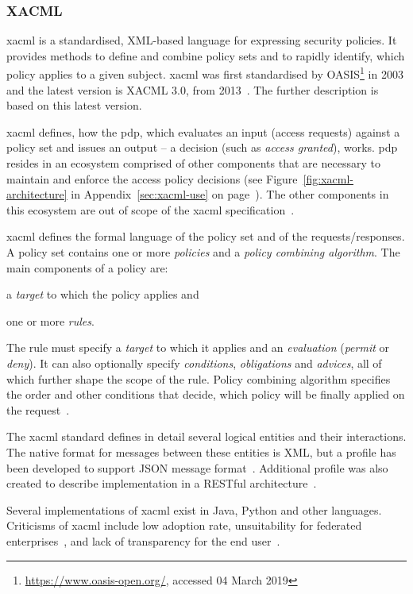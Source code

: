 \subsubsection{XACML}\label{sec:xacml}

 \acrfull{xacml} is a standardised, XML-based language for expressing security policies. It provides methods to define and combine policy sets and to rapidly identify, which policy applies to a given subject. \acrshort{xacml} was first standardised by OASIS\footnote{\url{https://www.oasis-open.org/}, accessed 04 March 2019} in 2003 and the latest version is XACML 3.0, from 2013~\cite{OASISStandard2013EXtensible3.0}. The further description is based on this latest version.
 
\acrshort{xacml} defines, how the \acrfull{pdp}, which evaluates an input (access requests) against a policy set and issues an output -- a decision (such as \textit{access granted}), works. \acrshort{pdp} resides in an ecosystem comprised of other components that are necessary to maintain and enforce the access policy decisions (see Figure~\ref{fig:xacml-architecture} in Appendix~\ref{sec:xacml-use} on page~\pageref{fig:xacml-architecture}). The other components in this ecosystem are out of scope of the \acrshort{xacml} specification~\cite{OASISStandard2013EXtensible3.0}.

\acrshort{xacml} defines the formal language of the policy set and of the requests/responses. A policy set contains one or more \textit{policies} and a \textit{policy combining algorithm}. The main components of a policy are:
% 
\begin{enumerate*}[label=(\roman*)]
    \item a \textit{target} to which the policy applies and
    \item one or more \textit{rules}.
\end{enumerate*} 
% 
The rule must specify a \textit{target} to which it applies and an \textit{evaluation} (\textit{permit} or \textit{deny}). It can also optionally specify \textit{conditions}, \textit{obligations} and \textit{advices}, all of which further shape the scope of the rule. Policy combining algorithm specifies the order and other conditions that decide, which policy will be finally applied on the request~\cite{OASISStandard2013EXtensible3.0}.
 
The \acrshort{xacml} standard defines in detail several logical entities and their interactions. The native format for messages between these entities is XML, but a profile has been developed to support JSON message format~\cite{2017JSON1.0}. Additional profile was also created to describe implementation in a RESTful architecture~\cite{2017REST1.0}.
 
 Several implementations of \acrshort{xacml} exist in Java, Python and other languages. Criticisms of \acrshort{xacml} include low adoption rate, unsuitability for federated enterprises~\cite{Cser2013XACMLDead}, and lack of transparency for the end user~\cite{Cser2013XACMLDead, Ardagna2011ExpressiveApplications}.

